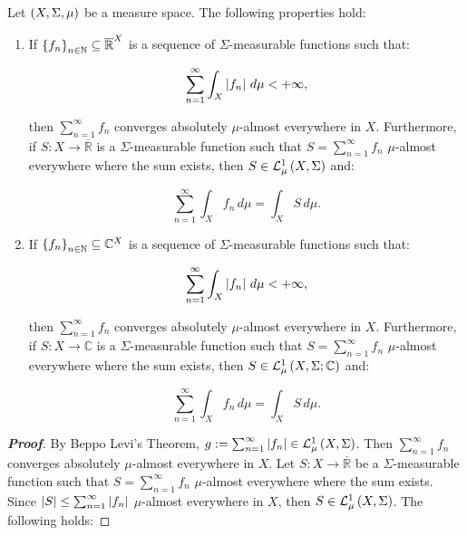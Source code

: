 \begin{proposition}
  Let $\left(X,\Sigma,\mu\right)$ be a measure space. The following properties hold:

  \begin{enumerate}
    \item If $\left\{f_n\right\}_{n\in\mathbb{N}}\subseteq\overline{\mathbb{R}}^X$ is a sequence of $\Sigma$-measurable functions such that:
    
    \begin{equation}
      \sum_{n=1}^{\infty}{\int_{X}{\left|f_n\right|\,d\mu}}<+\infty,
    \end{equation}

    then $\sum_{n=1}^{\infty}{f_n}$ converges absolutely $\mu$-almost everywhere in $X$. Furthermore, if $S:X\rightarrow\overline{\mathbb{R}}$ is a $\Sigma$-measurable function such that $S=\sum_{n=1}^{\infty}{f_n}$ $\mu$-almost everywhere where the sum exists, then $S\in\mathcal{L}^1_{\mu}\left(X,\Sigma\right)$ and:

    \begin{equation}
      \sum_{n=1}^{\infty}{\int_{X}{f_n}\,d\mu}=\int_{X}{S\,d\mu}.
    \end{equation}
    \item If $\left\{f_n\right\}_{n\in\mathbb{N}}\subseteq\mathbb{C}^X$ is a sequence of $\Sigma$-measurable functions such that:
    
    \begin{equation}
      \sum_{n=1}^{\infty}{\int_{X}{\left|f_n\right|\,d\mu}}<+\infty,
    \end{equation}

    then $\sum_{n=1}^{\infty}{f_n}$ converges absolutely $\mu$-almost everywhere in $X$. Furthermore, if $S:X\rightarrow\mathbb{C}$ is a $\Sigma$-measurable function such that $S=\sum_{n=1}^{\infty}{f_n}$ $\mu$-almost everywhere where the sum exists, then $S\in\mathcal{L}^1_{\mu}\left(X,\Sigma;\mathbb{C}\right)$ and:

    \begin{equation}
      \sum_{n=1}^{\infty}{\int_{X}{f_n}\,d\mu}=\int_{X}{S\,d\mu}.
    \end{equation}
  \end{enumerate}
  \begin{proof}[\rm\textbf{Proof}]
    By Beppo Levi's Theorem, $g:=\sum_{n=1}^{\infty}{\left|f_n\right|}\in\mathcal{L}^1_{\mu}\left(X,\Sigma\right)$. Then $\sum_{n=1}^{\infty}{f_n}$ converges absolutely $\mu$-almost everywhere in $X$. Let $S:X\rightarrow\overline{\mathbb{R}}$ be a $\Sigma$-measurable function such that $S=\sum_{n=1}^{\infty}{f_n}$ $\mu$-almost everywhere where the sum exists. Since $\left|S\right|\leq\sum_{n=1}^{\infty}{\left|f_n\right|}$ $\mu$-almost everywhere in $X$, then $S\in\mathcal{L}^1_{\mu}\left(X,\Sigma\right)$. The following holds:


\end{proof}
\end{proposition}
